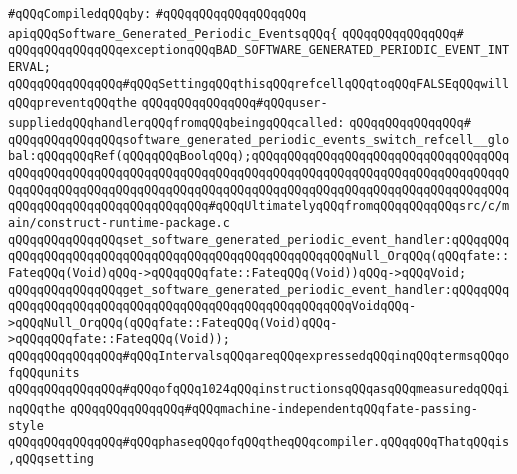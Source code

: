 \verb|#qQQqCompiledqQQqby:|\newline
\verb|#qQQqqQQqqQQqqQQqqQQq|\newline
\newline
\newline
\verb|apiqQQqSoftware_Generated_Periodic_EventsqQQq{|\newline
\verb|qQQqqQQqqQQqqQQq#|\newline
\verb|qQQqqQQqqQQqqQQqexceptionqQQqBAD_SOFTWARE_GENERATED_PERIODIC_EVENT_INTERVAL;|\newline
\newline
\verb|qQQqqQQqqQQqqQQq#qQQqSettingqQQqthisqQQqrefcellqQQqtoqQQqFALSEqQQqwillqQQqpreventqQQqthe|\newline
\verb|qQQqqQQqqQQqqQQq#qQQquser-suppliedqQQqhandlerqQQqfromqQQqbeingqQQqcalled:|\newline
\verb|qQQqqQQqqQQqqQQq#|\newline
\verb|qQQqqQQqqQQqqQQqsoftware_generated_periodic_events_switch_refcell__global:qQQqqQQqRef(qQQqqQQqBoolqQQq);qQQqqQQqqQQqqQQqqQQqqQQqqQQqqQQqqQQqqQQqqQQqqQQqqQQqqQQqqQQqqQQqqQQqqQQqqQQqqQQqqQQqqQQqqQQqqQQqqQQqqQQqqQQqqQQqqQQqqQQqqQQqqQQqqQQqqQQqqQQqqQQqqQQqqQQqqQQqqQQqqQQqqQQqqQQqqQQqqQQqqQQqqQQqqQQqqQQqqQQqqQQq#qQQqUltimatelyqQQqfromqQQqqQQqqQQqsrc/c/main/construct-runtime-package.c|\newline
\newline
\verb|qQQqqQQqqQQqqQQqset_software_generated_periodic_event_handler:qQQqqQQqqQQqqQQqqQQqqQQqqQQqqQQqqQQqqQQqqQQqqQQqqQQqqQQqNull_OrqQQq(qQQqfate::FateqQQq(Void)qQQq->qQQqqQQqfate::FateqQQq(Void))qQQq->qQQqVoid;|\newline
\verb|qQQqqQQqqQQqqQQqget_software_generated_periodic_event_handler:qQQqqQQqqQQqqQQqqQQqqQQqqQQqqQQqqQQqqQQqqQQqqQQqqQQqqQQqVoidqQQq->qQQqNull_OrqQQq(qQQqfate::FateqQQq(Void)qQQq->qQQqqQQqfate::FateqQQq(Void));|\newline
\newline
\verb|qQQqqQQqqQQqqQQq#qQQqIntervalsqQQqareqQQqexpressedqQQqinqQQqtermsqQQqofqQQqunits|\newline
\verb|qQQqqQQqqQQqqQQq#qQQqofqQQq1024qQQqinstructionsqQQqasqQQqmeasuredqQQqinqQQqthe|\newline
\verb|qQQqqQQqqQQqqQQq#qQQqmachine-independentqQQqfate-passing-style|\newline
\verb|qQQqqQQqqQQqqQQq#qQQqphaseqQQqofqQQqtheqQQqcompiler.qQQqqQQqThatqQQqis,qQQqsetting|\newline
